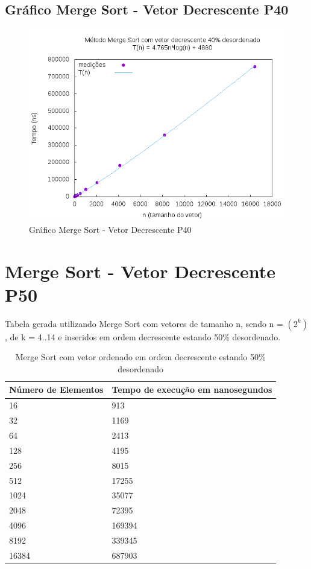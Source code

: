 \documentclass[12pt,a4paper,twoside]{report}
\begin{document}
\subsection{Gráfico Merge Sort - Vetor Decrescente P40}
\begin{figure}[H]
    \centering
    \includegraphics[width=0.7\linewidth]{graficos/MergeSort/vIntDecrescenteP40/vIntDecrescenteP40.png}
  \caption{Gráfico Merge Sort - Vetor Decrescente P40}
\end{figure}

\section{Merge Sort - Vetor Decrescente P50}
Tabela gerada utilizando Merge Sort com vetores de tamanho n, sendo n = $(2^k)$, de k = 4..14 e inseridos em ordem decrescente estando 50\% desordenado.
\begin{table}[H]
\centering
\caption{Merge Sort com vetor ordenado em ordem decrescente estando 50\% desordenado}
\label{my-label}
\begin{tabular}{|l|l|}
\hline
\multicolumn{1}{|c|}{\textbf{Número de Elementos}} & \multicolumn{1}{c|}{\textbf{Tempo de execução em nanosegundos}} \\ \hline
16 & 913 \\ \hline
32 & 1169 \\ \hline
64 & 2413 \\ \hline
128 & 4195 \\ \hline
256 & 8015 \\ \hline
512 & 17255 \\ \hline
1024 & 35077 \\ \hline
2048 & 72395 \\ \hline
4096 & 169394 \\ \hline
8192 & 339345 \\ \hline
16384 & 687903 \\ \hline
\end{tabular}
\end{table}
\end{document}
